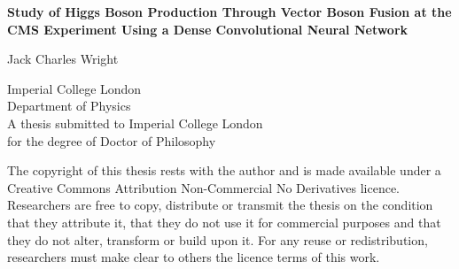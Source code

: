
\begin{titlepage}
    \begin{center}
        \vspace*{2cm}
        
        \huge{\textbf{Study of Higgs Boson Production Through Vector Boson Fusion at the CMS Experiment Using a Dense Convolutional Neural Network}}

        \vspace{1.5cm}
        \normalsize
        Jack Charles Wright
        
        \vspace{0.5cm}
        Imperial College London\\
        Department of Physics\\

        \vspace{5cm}
        A thesis submitted to Imperial College London\\
        for the degree of Doctor of Philosophy\\
        
    \end{center}
\end{titlepage}

The copyright of this thesis rests with the author and is made available under a Creative Commons Attribution Non-Commercial No Derivatives licence. Researchers are free to copy, distribute or transmit the thesis on the condition that they attribute it, that they do not use it for commercial purposes and that they do not alter, transform or build upon it. For any reuse or redistribution, researchers must make clear to others the licence terms of this work.

